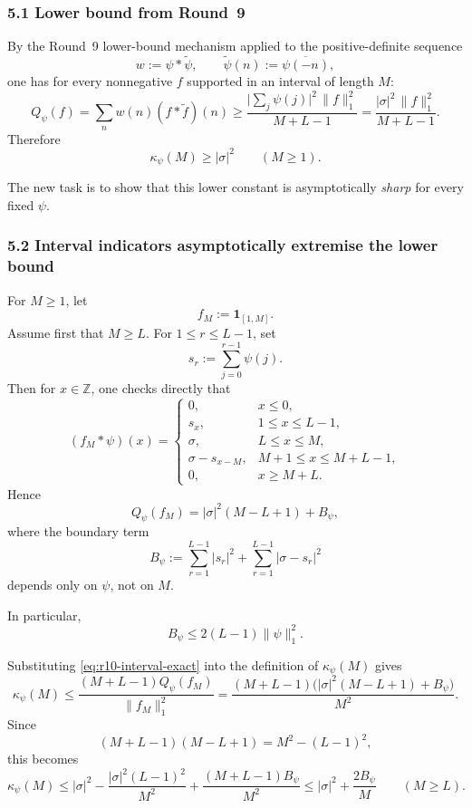 \subsubsection{5.1 Lower bound from Round~9}

By the Round~9 lower-bound mechanism applied to the positive-definite sequence
\[
w:=\psi*\widetilde \psi,
\qquad
\widetilde \psi(n):=\overline{\psi(-n)},
\]
one has for every nonnegative \(f\) supported in an interval of length \(M\):
\[
Q_\psi(f)=\sum_n w(n)(f*\widetilde f)(n)
\ge \frac{\bigl|\sum_j\psi(j)\bigr|^2\,\|f\|_1^2}{M+L-1}
=\frac{|\sigma|^2\,\|f\|_1^2}{M+L-1}.
\]
Therefore
\begin{equation}
\label{eq:r10-lower-kappa}
\kappa_\psi(M)\ge |\sigma|^2
\qquad (M\ge 1).
\end{equation}

The new task is to show that this lower constant is asymptotically \emph{sharp} for every fixed \(\psi\).

\subsubsection{5.2 Interval indicators asymptotically extremise the lower bound}

For \(M\ge 1\), let
\[
f_M:=\mathbf 1_{[1,M]}.
\]
Assume first that \(M\ge L\). For \(1\le r\le L-1\), set
\[
s_r:=\sum_{j=0}^{r-1}\psi(j).
\]
Then for \(x\in\mathbb Z\), one checks directly that
\[
(f_M*\psi)(x)=
\begin{cases}
0, & x\le 0,\\
s_x, & 1\le x\le L-1,\\
\sigma, & L\le x\le M,\\
\sigma-s_{x-M}, & M+1\le x\le M+L-1,\\
0, & x\ge M+L.
\end{cases}
\]
Hence
\begin{equation}
\label{eq:r10-interval-exact}
Q_\psi(f_M)
=
|\sigma|^2(M-L+1)+B_\psi,
\end{equation}
where the boundary term
\[
B_\psi:=\sum_{r=1}^{L-1}|s_r|^2+\sum_{r=1}^{L-1}|\sigma-s_r|^2
\]
depends only on \(\psi\), not on \(M\).

In particular,
\begin{equation}
\label{eq:r10-boundary-crude}
B_\psi\le 2(L-1)\|\psi\|_1^2.
\end{equation}

Substituting \eqref{eq:r10-interval-exact} into the definition of \(\kappa_\psi(M)\) gives
\[
\kappa_\psi(M)
\le
\frac{(M+L-1)Q_\psi(f_M)}{\|f_M\|_1^2}
=
\frac{(M+L-1)\bigl(|\sigma|^2(M-L+1)+B_\psi\bigr)}{M^2}.
\]
Since
\[
(M+L-1)(M-L+1)=M^2-(L-1)^2,
\]
this becomes
\begin{equation}
\label{eq:r10-upper-kappa}
\kappa_\psi(M)
\le
|\sigma|^2 - \frac{|\sigma|^2(L-1)^2}{M^2} + \frac{(M+L-1)B_\psi}{M^2}
\le
|\sigma|^2 + \frac{2B_\psi}{M}
\qquad (M\ge L).
\end{equation}


